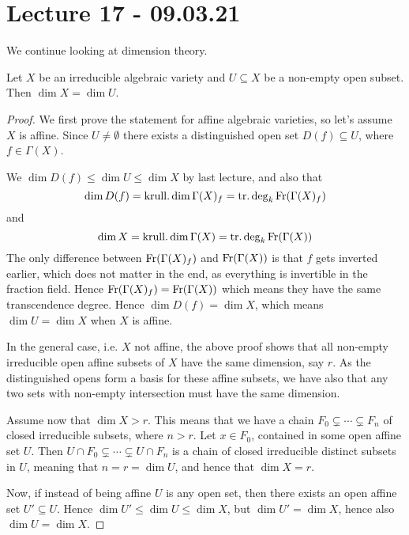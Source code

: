 
\section{Lecture 17 - 09.03.21}

We continue looking at dimension theory.

\begin{proposition}
Let $X$ be an irreducible algebraic variety and $U\subseteq X$ be a non-empty open subset. Then $\dim X = \dim U$. 
\end{proposition}
\begin{proof}
We first prove the statement for affine algebraic varieties, so let's assume $X$ is affine. Since $U\neq \emptyset$ there exists a distinguished open set $D(f)\subseteq U$, where $f\in \Gamma(X)$. 

We $\dim D(f) \leq \dim U \leq \dim X$ by last lecture, and also that 
\begin{equation*}
    \dim D(f) = \operatorname{krull.dim} \Gamma(X)_f = \operatorname{tr.deg}_k \operatorname{Fr}(\Gamma(X)_f)
\end{equation*}
and
\begin{equation*}
    \dim X = \operatorname{krull.dim} \Gamma(X) = \operatorname{tr.deg}_k\operatorname{Fr}(\Gamma(X))
\end{equation*}
The only difference between $\operatorname{Fr}(\Gamma(X)_f)$ and $\operatorname{Fr}(\Gamma(X))$ is that $f$ gets inverted earlier, which does not matter in the end, as everything is invertible in the fraction field. Hence $\operatorname{Fr}(\Gamma(X)_f)=\operatorname{Fr}(\Gamma(X))$ which means they have the same transcendence degree. Hence $\dim D(f) = \dim X$, which means $\dim U = \dim X$ when $X$ is affine. 

In the general case, i.e. $X$ not affine, the above proof shows that all non-empty irreducible open affine subsets of $X$ have the same dimension, say $r$. As the distinguished opens form a basis for these affine subsets, we have also that any two sets with non-empty intersection must have the same dimension. 

Assume now that $\dim X> r$. This means that we have a chain $F_0\subsetneq \cdots \subsetneq F_n$ of closed irreducible subsets, where $n>r$. Let $x\in F_0$, contained in some open affine set $U$. Then $U\cap F_0\subsetneq \cdots \subsetneq U\cap F_n$ is a chain of closed irreducible distinct subsets in $U$, meaning that $n = r = \dim U$, and hence that $\dim X = r$. 

Now, if instead of being affine $U$ is any open set, then there exists an open affine set $U'\subseteq U$. Hence $\dim U' \leq \dim U \leq \dim X$, but $\dim U' = \dim X$, hence also $\dim U = \dim X$. 
\end{proof}

